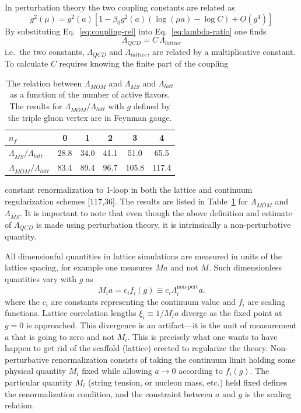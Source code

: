 In perturbation theory the two coupling constants are related as
\begin{equation}
  g^2(\mu) = g^2(a)\left[1 - \beta_0 g^2(a)\left(\log(\mu a)
    - \log C\right) + O(g^4)\right]
  \label{eq:coupling-rel}
\end{equation}
By substituting Eq.~\eqref{eq:coupling-rel} into Eq.~\eqref{eq:lambda-ratio}
one finds
\begin{equation}
  \Lambda_{QCD} = C\, \Lambda_{lattice}
  \label{eq:lambda-C}
\end{equation}
i.e.\ the two constants, $\Lambda_{QCD}$ and $\Lambda_{lattice}$, are
related by a multiplicative constant. To calculate $C$ requires knowing the
finite part of the coupling

\begin{table}[htbp]
  \centering
  \begin{tabular}{lccccc}
    \toprule
    $n_f$ & 0 & 1 & 2 & 3 & 4 \\
    \midrule
    $\Lambda_{\overline{MS}}/\Lambda_{latt}$ & 28.8 & 34.0 & 41.1 & 51.0 & 65.5 \\
    $\Lambda_{\overline{MOM}}/\Lambda_{latt}$ & 83.4 & 89.4 & 96.7 & 105.8 & 117.4 \\
    \bottomrule
  \end{tabular}
  \caption{The relation between $\Lambda_{\overline{MOM}}$ and
    $\Lambda_{\overline{MS}}$ and $\Lambda_{latt}$ as a function of the
    number of active flavors. The results for
    $\Lambda_{\overline{MOM}}/\Lambda_{latt}$ with $g$ defined by the
    triple gluon vertex are in Feynman gauge.}
  \label{tab:6}
\end{table}

constant renormalization to 1-loop in both the lattice and continuum
regularization schemes [117,36]. The results are listed in
Table~\ref{tab:6} for $\Lambda_{\overline{MOM}}$ and
$\Lambda_{\overline{MS}}$. It is important to note that even though the
above definition and estimate of $\Lambda_{QCD}$ is made using perturbation
theory, it is intrinsically a non-perturbative quantity.

All dimensionful quantities in lattice simulations are measured in units of
the lattice spacing, for example one measures $M a$ and not $M$. Such
dimensionless quantities vary with $g$ as
\begin{equation}
  M_i a = c_i f_i(g) \equiv c_i \Lambda_i^{\mathrm{non}\text{-}\mathrm{pert}} a .
  \label{eq:scaling-ma}
\end{equation}
where the $c_i$ are constants representing the continuum value and $f_i$ are
scaling functions. Lattice correlation lengths $\xi_i \equiv 1/M_i a$
diverge as the fixed point at $g = 0$ is approached. This divergence is an
artifact---it is the unit of measurement $a$ that is going to zero and not
$M_i$. This is precisely what one wants to have happen to get rid of the
scaffold (lattice) erected to regularize the theory. Non-perturbative
renormalization consists of taking the continuum limit holding some
physical quantity $M_i$ fixed while allowing $a \to 0$ according to
$f_i(g)$. The particular quantity $M_i$ (string tension, or nucleon mass,
etc.) held fixed defines the renormalization condition, and the constraint
between $a$ and $g$ is the scaling relation.

